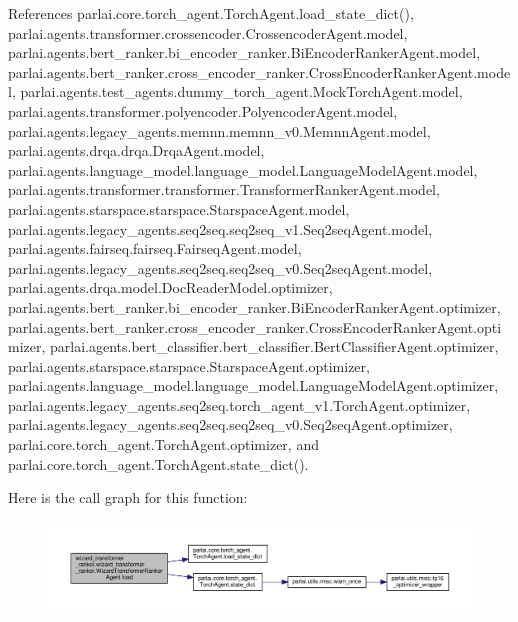 References parlai.\+core.\+torch\+\_\+agent.\+Torch\+Agent.\+load\+\_\+state\+\_\+dict(), parlai.\+agents.\+transformer.\+crossencoder.\+Crossencoder\+Agent.\+model, parlai.\+agents.\+bert\+\_\+ranker.\+bi\+\_\+encoder\+\_\+ranker.\+Bi\+Encoder\+Ranker\+Agent.\+model, parlai.\+agents.\+bert\+\_\+ranker.\+cross\+\_\+encoder\+\_\+ranker.\+Cross\+Encoder\+Ranker\+Agent.\+model, parlai.\+agents.\+test\+\_\+agents.\+dummy\+\_\+torch\+\_\+agent.\+Mock\+Torch\+Agent.\+model, parlai.\+agents.\+transformer.\+polyencoder.\+Polyencoder\+Agent.\+model, parlai.\+agents.\+legacy\+\_\+agents.\+memnn.\+memnn\+\_\+v0.\+Memnn\+Agent.\+model, parlai.\+agents.\+drqa.\+drqa.\+Drqa\+Agent.\+model, parlai.\+agents.\+language\+\_\+model.\+language\+\_\+model.\+Language\+Model\+Agent.\+model, parlai.\+agents.\+transformer.\+transformer.\+Transformer\+Ranker\+Agent.\+model, parlai.\+agents.\+starspace.\+starspace.\+Starspace\+Agent.\+model, parlai.\+agents.\+legacy\+\_\+agents.\+seq2seq.\+seq2seq\+\_\+v1.\+Seq2seq\+Agent.\+model, parlai.\+agents.\+fairseq.\+fairseq.\+Fairseq\+Agent.\+model, parlai.\+agents.\+legacy\+\_\+agents.\+seq2seq.\+seq2seq\+\_\+v0.\+Seq2seq\+Agent.\+model, parlai.\+agents.\+drqa.\+model.\+Doc\+Reader\+Model.\+optimizer, parlai.\+agents.\+bert\+\_\+ranker.\+bi\+\_\+encoder\+\_\+ranker.\+Bi\+Encoder\+Ranker\+Agent.\+optimizer, parlai.\+agents.\+bert\+\_\+ranker.\+cross\+\_\+encoder\+\_\+ranker.\+Cross\+Encoder\+Ranker\+Agent.\+optimizer, parlai.\+agents.\+bert\+\_\+classifier.\+bert\+\_\+classifier.\+Bert\+Classifier\+Agent.\+optimizer, parlai.\+agents.\+starspace.\+starspace.\+Starspace\+Agent.\+optimizer, parlai.\+agents.\+language\+\_\+model.\+language\+\_\+model.\+Language\+Model\+Agent.\+optimizer, parlai.\+agents.\+legacy\+\_\+agents.\+seq2seq.\+torch\+\_\+agent\+\_\+v1.\+Torch\+Agent.\+optimizer, parlai.\+agents.\+legacy\+\_\+agents.\+seq2seq.\+seq2seq\+\_\+v0.\+Seq2seq\+Agent.\+optimizer, parlai.\+core.\+torch\+\_\+agent.\+Torch\+Agent.\+optimizer, and parlai.\+core.\+torch\+\_\+agent.\+Torch\+Agent.\+state\+\_\+dict().

Here is the call graph for this function\+:
\nopagebreak
\begin{figure}[H]
\begin{center}
\leavevmode
\includegraphics[width=350pt]{classwizard__transformer__ranker_1_1wizard__transformer__ranker_1_1WizardTransformerRankerAgent_a0dc84b46e7df927db8235f2f2a48f5b0_cgraph}
\end{center}
\end{figure}


